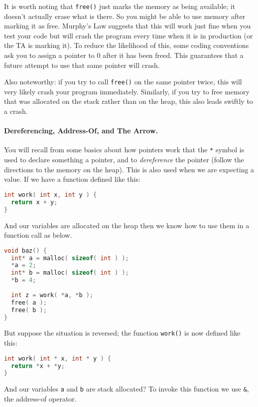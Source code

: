 It is worth noting that \texttt{free()} just marks the memory as being available; it doesn't actually erase what is there. So you might be able to use memory after marking it as free. Murphy's Law suggests that this will work just fine when you test your code but will crash the program every time when it is in production (or the TA is marking it). To reduce the likelihood of this, some coding conventions ask you to assign a pointer to 0 after it has been freed. This guarantees that a future attempt to use that same pointer will crash.

Also noteworthy: if you try to call \texttt{free()} on the same pointer twice, this will very likely crash your program immediately. Similarly, if you try to free memory that was allocated on the stack rather than on the heap, this also leads swiftly to a crash.

\paragraph{Dereferencing, Address-Of, and The Arrow.}
You will recall from some basics about how pointers work that the \texttt{*} symbol is used to declare something a pointer, and to \textit{dereference} the pointer (follow the directions to the memory on the heap). This is also used when we are expecting a value. If we have a function defined like this:

\begin{lstlisting}[language=C]
int work( int x, int y ) {
  return x + y;
}
\end{lstlisting}

And our variables are allocated on the heap then we know how to use them in a function call as below.

\begin{lstlisting}[language=C]
void baz() {
  int* a = malloc( sizeof( int ) );
  *a = 2;
  int* b = malloc( sizeof( int ) );
  *b = 4;
  
  int z = work( *a, *b );
  free( a );
  free( b );
}
\end{lstlisting}

But suppose the situation is reversed; the function \texttt{work()} is now defined like this:

\begin{lstlisting}[language=C]
int work( int * x, int * y ) {
  return *x + *y;
}
\end{lstlisting}

And our variables \texttt{a} and \texttt{b} are stack allocated? To invoke this function we use \texttt{\&}, the address-of operator.

